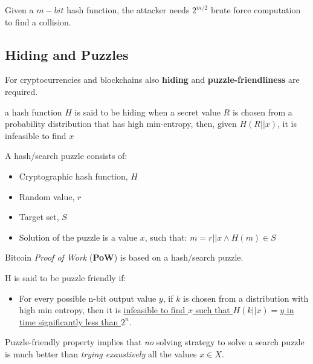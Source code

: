Given a $m-bit$ hash function, the attacker needs $2^{m/2}$ brute force computation to
find a collision.

\subsection{Hiding and Puzzles}
For cryptocurrencies and blockchains also \textbf{hiding} and \textbf{puzzle-friendliness} are required.
\begin{definition}[Hiding]
a hash function $H$ is said to be hiding when a secret value $R$ is chosen from
a probability distribution that has high min-entropy, then, given  $H(R || x)$, it is infeasible to find $x$
\end{definition}
\nl

A hash/search puzzle consists of:
\begin{itemize}
   \item Cryptographic hash function, $H$
   \item Random value, $r$
   \item Target set, $S$
   \item Solution of the puzzle is a value $x$, such that:
   $m = r || x \wedge H(m) \in S$
\end{itemize}
Bitcoin \textit{Proof of Work} (\textbf{PoW}) is based on a hash/search puzzle.
\begin{definition}
   H is said to be puzzle friendly if:
   \begin{itemize}
      \item For every possible n-bit output value $y$, if $k$ is chosen from a distribution with high min entropy, then it is \ul{infeasible to find $x$ such that $H(k || x) = y$ in time significantly less than $2^n$}.
   \end{itemize}
\end{definition}
Puzzle-friendly property implies that
\textit{no} solving strategy to solve a search puzzle is much better than \textit{trying exaustively} all the values $x \in X$.

